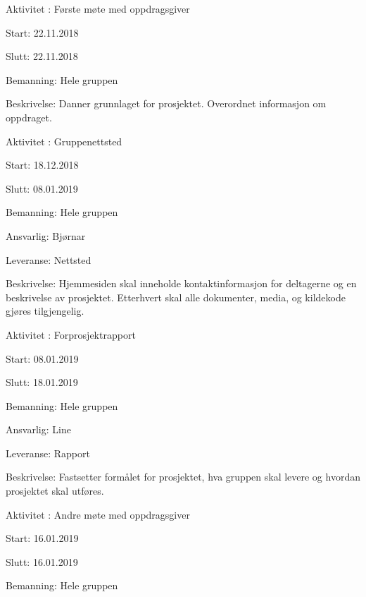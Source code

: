 \documentclass[11pt,a4paper]{report}
\begin{document}
\begin{compactdesc}
    \item [Aktivitet \arabic{aktivitetTeller}:] Første møte med oppdragsgiver
	\begin{compactitem}
	\item Start: 22.11.2018
	\item Slutt: 22.11.2018
	\item Bemanning: Hele gruppen
	\item Beskrivelse: Danner grunnlaget for prosjektet. Overordnet informasjon om oppdraget.
	\end{compactitem}
	\addtocounter{aktivitetTeller}{1}
	\item [Aktivitet \arabic{aktivitetTeller}:] Gruppenettsted
	\begin{compactitem} 
	\item Start: 18.12.2018
	\item Slutt: 08.01.2019
	\item Bemanning: Hele gruppen
	\item Ansvarlig: Bjørnar
	\item Leveranse: Nettsted
	\item Beskrivelse: Hjemmesiden skal inneholde kontaktinformasjon for deltagerne og en beskrivelse av prosjektet. Etterhvert skal alle dokumenter, media, og kildekode gjøres tilgjengelig.
	\addtocounter{aktivitetTeller}{1}
	\end{compactitem}
	\item [Aktivitet \arabic{aktivitetTeller}:] Forprosjektrapport
	\begin{compactitem}
	\item Start: 08.01.2019
	\item Slutt: 18.01.2019
	\item Bemanning: Hele gruppen
	\item Ansvarlig: Line
	\item Leveranse: Rapport
	\item Beskrivelse: Fastsetter formålet for prosjektet, hva gruppen skal levere og hvordan prosjektet skal utføres.
	\addtocounter{aktivitetTeller}{1}
	\end{compactitem}
	\item [Aktivitet \arabic{aktivitetTeller}:] Andre møte med oppdragsgiver
	\begin{compactitem}
	\item Start: 16.01.2019
	\item Slutt: 16.01.2019
	\item Bemanning: Hele gruppen

\end{compactitem}
\end{compactdesc}
\end{document}
